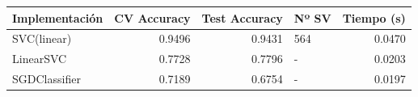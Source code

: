 \begin{tabular}{lrrlr}
\toprule
Implementación & CV Accuracy & Test Accuracy & Nº SV & Tiempo (s) \\
\midrule
SVC(linear) & 0.9496 & 0.9431 & 564 & 0.0470 \\
LinearSVC & 0.7728 & 0.7796 & - & 0.0203 \\
SGDClassifier & 0.7189 & 0.6754 & - & 0.0197 \\
\bottomrule
\end{tabular}
